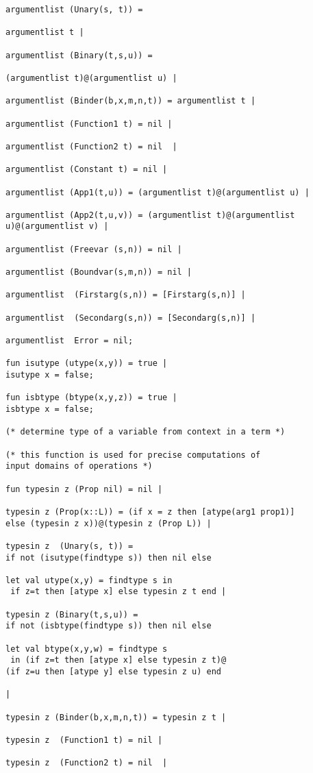 \documentclass{article}
\begin{document}
{{\begin{verbatim}
argumentlist (Unary(s, t)) = 

argumentlist t |

argumentlist (Binary(t,s,u)) = 

(argumentlist t)@(argumentlist u) |

argumentlist (Binder(b,x,m,n,t)) = argumentlist t |

argumentlist (Function1 t) = nil |

argumentlist (Function2 t) = nil  |

argumentlist (Constant t) = nil |

argumentlist (App1(t,u)) = (argumentlist t)@(argumentlist u) |

argumentlist (App2(t,u,v)) = (argumentlist t)@(argumentlist u)@(argumentlist v) |

argumentlist (Freevar (s,n)) = nil |

argumentlist (Boundvar(s,m,n)) = nil |

argumentlist  (Firstarg(s,n)) = [Firstarg(s,n)] |

argumentlist  (Secondarg(s,n)) = [Secondarg(s,n)] |

argumentlist  Error = nil;

fun isutype (utype(x,y)) = true |
isutype x = false;

fun isbtype (btype(x,y,z)) = true |
isbtype x = false;

(* determine type of a variable from context in a term *)

(* this function is used for precise computations of 
input domains of operations *)

fun typesin z (Prop nil) = nil |

typesin z (Prop(x::L)) = (if x = z then [atype(arg1 prop1)] 
else (typesin z x))@(typesin z (Prop L)) |

typesin z  (Unary(s, t)) = 
if not (isutype(findtype s)) then nil else

let val utype(x,y) = findtype s in
 if z=t then [atype x] else typesin z t end |

typesin z (Binary(t,s,u)) = 
if not (isbtype(findtype s)) then nil else

let val btype(x,y,w) = findtype s
 in (if z=t then [atype x] else typesin z t)@
(if z=u then [atype y] else typesin z u) end

|

typesin z (Binder(b,x,m,n,t)) = typesin z t |

typesin z  (Function1 t) = nil |

typesin z  (Function2 t) = nil  |


\end{verbatim}}}
\end{document}
